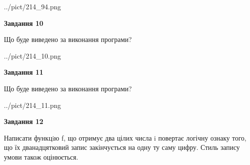 \documentclass[12pt, ukrainian]{article}
\begin{document}
{\begin {large}
\begin{center}
	{../pict/214_94.png}
\end{center}
\newpage

{\begin {center}\textbf{Завдання 10}\end {center}}

Що буде виведено за виконання програми?\par
\begin{center}
	{../pict/214_10.png}
\end{center}
\newpage

{\begin {center}\textbf{Завдання 11}\end {center}}

Що буде виведено за виконання програми?\par
\begin{center}
	{../pict/214_11.png}
\end{center}
\newpage

{\begin {center}\textbf{Завдання 12}\end {center}}


Написати функцiю f, що отримує два цілих числа i повертає логічну ознаку того, що їх дванадцятковий запис закінчується на одну ту саму цифру. Стиль запису умови також оцінюється.\par
\newpage

\end {large}}
\end{document}
